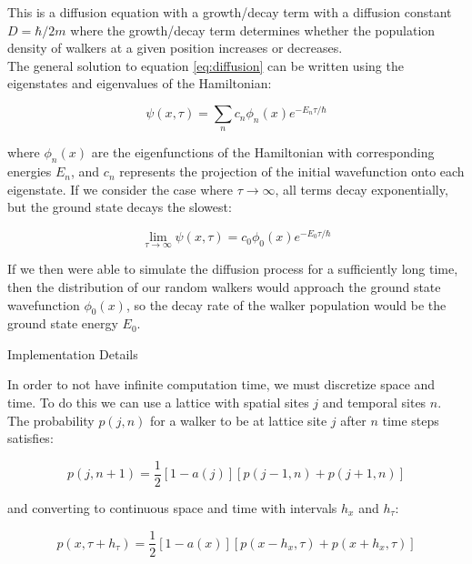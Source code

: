 \documentclass[reqno]{amsart}
\makeatletter
\renewcommand\subsection{\@startsection{subsection}{2}%
  \z@{.5\linespacing\@plus.7\linespacing}{-.5em}%
  {\normalfont\scshape\justify}}
\numberwithin{equation}{section}
\numberwithin{figure}{section}
\makeatother
\begin{document}
This is a diffusion equation with a growth/decay term with a diffusion constant $D = \hbar/2m$ where the growth/decay term determines whether the population density of walkers at a given position increases or decreases. \\

The general solution to equation \ref{eq:diffusion} can be written using the eigenstates and eigenvalues of the Hamiltonian:

\begin{equation}
\psi(x,\tau) = \sum_n c_n \phi_n(x)e^{-E_n\tau/\hbar}
\end{equation}

where $\phi_n(x)$ are the eigenfunctions of the Hamiltonian with corresponding energies $E_n$, and $c_n$ represents the projection of the initial wavefunction onto each eigenstate. If we consider the case where $\tau \to \infty$, all terms decay exponentially, but the ground state decays the slowest:

\begin{equation}
\lim_{\tau \to \infty}\psi(x,\tau) = c_0\phi_0(x)e^{-E_0\tau/\hbar}
\end{equation}

If we then were able to simulate the diffusion process for a sufficiently long time, then the distribution of our random walkers would approach the ground state wavefunction $\phi_0(x)$, so the decay rate of the walker population would be the ground state energy $E_0$.

\subsection{Implementation Details}

In order to not have infinite computation time, we must discretize space and time. To do this we can use a lattice with spatial sites $j$ and temporal sites $n$. The probability $p(j,n)$ for a walker to be at lattice site $j$ after $n$ time steps satisfies:

\begin{equation}
p(j,n+1) = \frac{1}{2}[1-a(j)][p(j-1,n) + p(j+1,n)]
\end{equation}

and converting to continuous space and time with intervals $h_x$ and $h_\tau$:

\begin{equation}
p(x, \tau + h_\tau) = \frac{1}{2} \left[1 - a(x)\right] \left[p(x - h_x, \tau) + p(x + h_x, \tau)\right]
\end{equation}
\end{document}
